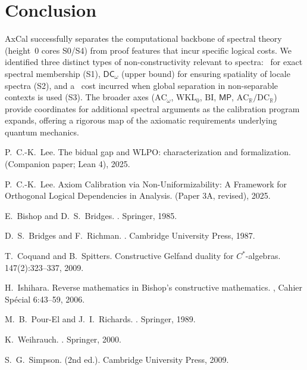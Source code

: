 \documentclass[11pt]{article}
\newcommand{\WLPO}{\mathsf{WLPO}}
\newcommand{\DCw}{\mathsf{DC}_{\omega}}
\newcommand{\MP}{\mathsf{MP}}
\theoremstyle{plain}
\theoremstyle{definition}
\theoremstyle{remark}
\newcommand{\ACw}{\mathrm{AC}_\omega}
\newcommand{\ACR}{\mathrm{AC}_{\mathbb{R}}}
\newcommand{\DCR}{\mathrm{DC}_{\mathbb{R}}}
\newcommand{\WKLz}{\mathrm{WKL}_0}
\newcommand{\BI}{\mathrm{BI}}
\begin{document}
\section{Conclusion}

AxCal successfully separates the computational backbone of spectral theory (height~0 cores S0/S4) from proof features that incur specific logical costs.
We identified three distinct types of non-constructivity relevant to spectra:
\MP\ for exact spectral membership (S1), $\DCw$ (upper bound) for ensuring spatiality of locale spectra (S2), and a \WLPO\ cost incurred when global separation in non-separable contexts is used (S3).
The broader axes ($\ACw$, $\WKLz$, $\BI$, $\MP$, $\ACR/\DCR$) provide coordinates for additional spectral arguments as the calibration program expands, offering a rigorous map of the axiomatic requirements underlying quantum mechanics.

\bigskip


\begin{thebibliography}{99}

P.~C.-K.~Lee.
\newblock The bidual gap and WLPO: characterization and formalization.
\newblock (Companion paper; Lean 4), 2025.

P.~C.-K.~Lee.
\newblock Axiom Calibration via Non-Uniformizability: A Framework for Orthogonal Logical Dependencies in Analysis.
\newblock (Paper 3A, revised), 2025.

E.~Bishop and D.~S.~Bridges.
.
\newblock Springer, 1985.

D.~S.~Bridges and F.~Richman.
.
\newblock Cambridge University Press, 1987.

T.~Coquand and B.~Spitters.
\newblock Constructive Gelfand duality for $C^*$-algebras.
 147(2):323--337, 2009.

H.~Ishihara.
\newblock Reverse mathematics in {B}ishop's constructive mathematics.
, Cahier Sp\'ecial 6:43--59, 2006.

M.~B.~Pour-El and J.~I.~Richards.
.
\newblock Springer, 1989.

K.~Weihrauch.
.
\newblock Springer, 2000.

S.~G.~Simpson.
 (2nd ed.).
\newblock Cambridge University Press, 2009.

\end{thebibliography}
\end{document}
